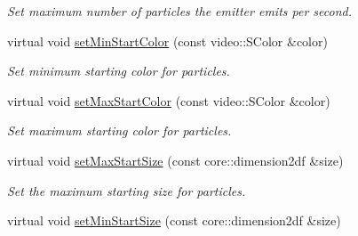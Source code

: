 \begin{DoxyCompactItemize}
\begin{DoxyCompactList}\small\item\em Set maximum number of particles the emitter emits per second. \end{DoxyCompactList}\item 
\hypertarget{classirr_1_1scene_1_1_c_particle_mesh_emitter_a9aec9a031f3ce03c0098f1557499a1d2}{virtual void \hyperlink{classirr_1_1scene_1_1_c_particle_mesh_emitter_a9aec9a031f3ce03c0098f1557499a1d2}{set\-Min\-Start\-Color} (const video\-::\-S\-Color \&color)}\label{classirr_1_1scene_1_1_c_particle_mesh_emitter_a9aec9a031f3ce03c0098f1557499a1d2}

\begin{DoxyCompactList}\small\item\em Set minimum starting color for particles. \end{DoxyCompactList}\item 
\hypertarget{classirr_1_1scene_1_1_c_particle_mesh_emitter_ab206c93d56a157a6b466fe9349b23399}{virtual void \hyperlink{classirr_1_1scene_1_1_c_particle_mesh_emitter_ab206c93d56a157a6b466fe9349b23399}{set\-Max\-Start\-Color} (const video\-::\-S\-Color \&color)}\label{classirr_1_1scene_1_1_c_particle_mesh_emitter_ab206c93d56a157a6b466fe9349b23399}

\begin{DoxyCompactList}\small\item\em Set maximum starting color for particles. \end{DoxyCompactList}\item 
\hypertarget{classirr_1_1scene_1_1_c_particle_mesh_emitter_a3390120da54233966f5e273731e47be1}{virtual void \hyperlink{classirr_1_1scene_1_1_c_particle_mesh_emitter_a3390120da54233966f5e273731e47be1}{set\-Max\-Start\-Size} (const core\-::dimension2df \&size)}\label{classirr_1_1scene_1_1_c_particle_mesh_emitter_a3390120da54233966f5e273731e47be1}

\begin{DoxyCompactList}\small\item\em Set the maximum starting size for particles. \end{DoxyCompactList}\item 
\hypertarget{classirr_1_1scene_1_1_c_particle_mesh_emitter_a94d0d57d6aee16f8608c0e92212f3951}{virtual void \hyperlink{classirr_1_1scene_1_1_c_particle_mesh_emitter_a94d0d57d6aee16f8608c0e92212f3951}{set\-Min\-Start\-Size} (const core\-::dimension2df \&size)}\label{classirr_1_1scene_1_1_c_particle_mesh_emitter_a94d0d57d6aee16f8608c0e92212f3951}


\end{DoxyCompactItemize}
